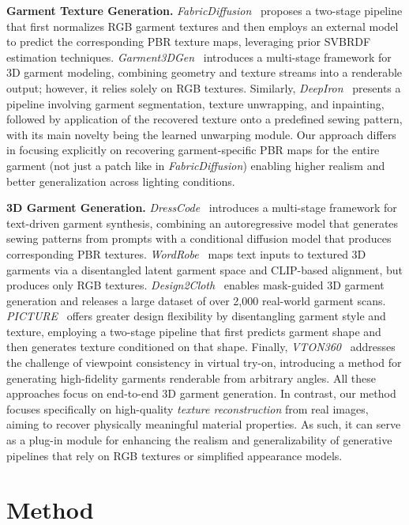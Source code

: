 \documentclass[11pt,twocolumn]{article}
\begin{document}
\textbf{Garment Texture Generation.} \textit{FabricDiffusion}~\cite{fabricdiffusion} proposes a two-stage pipeline that first normalizes RGB garment textures 
and then employs an external model to predict the corresponding PBR texture maps, leveraging prior SVBRDF estimation techniques. 
\textit{Garment3DGen}~\cite{garment3dgen} introduces a multi-stage framework for 3D garment modeling, combining geometry and texture streams into a 
renderable output; however, it relies solely on RGB textures. Similarly, \textit{DeepIron}~\cite{deepiron} presents a pipeline involving garment segmentation, 
texture unwrapping, and inpainting, followed by application of the recovered texture onto a predefined sewing pattern, 
with its main novelty being the learned unwarping module. Our approach differs in focusing explicitly on recovering garment-specific PBR maps for the 
entire garment (not just a patch like in \textit{FabricDiffusion}) enabling higher realism and better generalization across lighting conditions.

\textbf{3D Garment Generation.}  
\textit{DressCode}~\cite{dresscode} introduces a multi-stage framework for text-driven garment synthesis, combining an autoregressive model that generates sewing patterns from prompts with a conditional diffusion model that produces corresponding PBR textures. \textit{WordRobe}~\cite{WordRobe} maps text inputs to textured 3D garments via a disentangled latent garment space and CLIP-based alignment, but produces only RGB textures. \textit{Design2Cloth}~\cite{design2cloth} enables mask-guided 3D garment generation and releases a large dataset of over 2{,}000 real-world garment scans. \textit{PICTURE}~\cite{picture} offers greater design flexibility by disentangling garment style and texture, employing a two-stage pipeline that first predicts garment shape and then generates texture conditioned on that shape. Finally, \textit{VTON360}~\cite{vton360} addresses the challenge of viewpoint consistency in virtual try-on, introducing a method for generating high-fidelity garments renderable from arbitrary angles.  
All these approaches focus on end-to-end 3D garment generation. In contrast, our method focuses specifically on high-quality \textit{texture reconstruction} from real images, aiming to recover physically meaningful material properties. As such, it can serve as a plug-in module for enhancing the realism and generalizability of generative pipelines that rely on RGB textures or simplified appearance models.


\section{Method}
\end{document}
